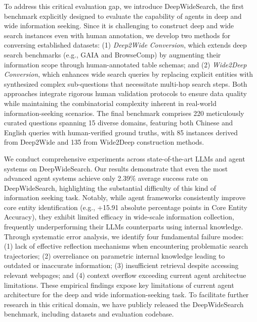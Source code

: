 \documentclass[11pt, letterpaper, logo, onecolumn, copyright, numbering]{paper_improved}
\begin{document}
To address this critical evaluation gap, we introduce DeepWideSearch, the first benchmark explicitly designed to evaluate the capability of agents in deep and wide information seeking. 
Since it is challenging to construct deep and wide search instances even with human annotation, we develop two methods for conversing established datasets: (1) \textit{Deep2Wide Conversion}, which extends deep search benchmarks (e.g., GAIA and BrowseComp) by augmenting their information scope through human-annotated table schemas; and (2) \textit{Wide2Deep Conversion}, which enhances wide search queries by replacing explicit entities with synthesized complex sub-questions that necessitate multi-hop search steps. Both approaches integrate rigorous human validation protocols to ensure data quality while maintaining the combinatorial complexity inherent in real-world information-seeking scenarios. The final benchmark comprises 220 meticulously curated questions spanning 15 diverse domains, featuring both Chinese and English queries with human-verified ground truths, with 85 instances derived from Deep2Wide and 135 from Wide2Deep construction methods.

We conduct comprehensive experiments across state-of-the-art LLMs and agent systems on DeepWideSearch. Our results demonstrate that even the most advanced agent systems achieve only 2.39\% average success rate on DeepWideSearch, highlighting the substantial difficulty of this kind of information seeking task. Notably, while agent frameworks consistently improve core entity identification (e.g., +15.91 absolute percentage points in Core Entity Accuracy), they exhibit limited efficacy in wide-scale information collection, frequently underperforming their LLMs counterparts using internal knowledge. Through systematic error analysis, we identify four fundamental failure modes: (1) lack of effective reflection mechanisms when encountering problematic search trajectories; (2) overreliance on parametric internal knowledge leading to outdated or inaccurate information; (3) insufficient retrieval despite accessing relevant webpages; and (4) context overflow exceeding current agent architectue limitations. These empirical findings expose key limitations of current agent architecture for the deep and wide information-seeking task. To facilitate further research in this critical domain, we have publicly released the DeepWideSearch benchmark, including datasets and evaluation codebase.
\end{document}
